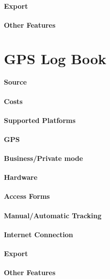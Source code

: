 \paragraph{Export}
\paragraph{Other Features}
\newpage
\section{GPS Log Book}
\paragraph{Source} 
\paragraph{Costs} 
\paragraph{Supported Platforms} 
\paragraph{GPS} 
\paragraph{Business/Private mode}
\paragraph{Hardware}
\paragraph{Access Forms}
\paragraph{Manual/Automatic Tracking}
\paragraph{Internet Connection}
\paragraph{Export}
\paragraph{Other Features}
\newpage
